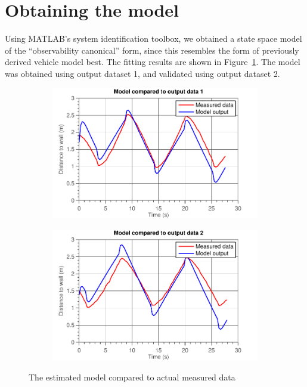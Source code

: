 \documentclass[11pt,titlepage]{report}
\begin{document}
\section{Obtaining the model}
Using MATLAB's system identification toolbox, we obtained a state space model of the ``observability canonical'' form, since this resembles the form of previously derived vehicle model best. The fitting results are shown in Figure~\ref{fig:ass1-fit}. The model was obtained using output dataset \num{1}, and validated using output dataset \num{2}.

\begin{figure}[H]
	\begin{subfigure}{.5\textwidth}
		\begin{center}
			\includegraphics[width=\linewidth]{resource/model-fit1.pdf}
		\end{center}
	\end{subfigure}
	\begin{subfigure}{.5\textwidth}
		\begin{center}
			\includegraphics[width=\linewidth]{resource/model-fit2.pdf}
		\end{center}
	\end{subfigure}
	\caption{The estimated model compared to actual measured data}
	\label{fig:ass1-fit}
\end{figure}
\end{document}
